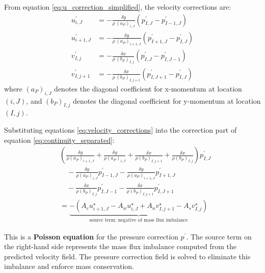 \documentclass[12pt]{article}
\theoremstyle{plain}  %
\theoremstyle{definition}  %
\begin{document}

\noindent From equation \eqref{eq:u_correction_simplified}, the velocity corrections are:
\begin{equation}\label{eq:velocity_corrections}
\begin{aligned}
u_{i,J}^{\prime} &= -\frac{\delta y}{\rho \, (a_{P})_{i,J}}(p_{I,J}^{\prime} - p_{I-1,J}^{\prime})\\[1ex]
u_{i+1,J}^{\prime} &= -\frac{\delta y}{\rho \, (a_{P})_{i+1,J}}(p_{I+1,J}^{\prime} - p_{I,J}^{\prime})\\[1ex]
v_{I,j}^{\prime} &= -\frac{\delta x}{\rho \, (b_{P})_{I,j}}(p_{I,J}^{\prime} - p_{I,J-1}^{\prime})\\[1ex]
v_{I,j+1}^{\prime} &= -\frac{\delta x}{\rho \, (b_{P})_{I,j+1}}(p_{I,J+1}^{\prime} - p_{I,J}^{\prime})
\end{aligned}
\end{equation}
where $(a_{P})_{i,J}$ denotes the diagonal coefficient for x-momentum at location $(i,J)$, and $(b_{P})_{I,j}$ denotes the diagonal coefficient for y-momentum at location $(I,j)$.


\noindent Substituting equations \eqref{eq:velocity_corrections} into the correction part of equation \eqref{eq:continuity_separated}:
\begin{equation}\label{eq:pressure_poisson}
\begin{aligned}
&\left(\frac{\delta y}{\rho(a_P)_{i+1,J}} + \frac{\delta y}{\rho(a_P)_{i,J}} + \frac{\delta x}{\rho(b_P)_{I,j+1}} + \frac{\delta x}{\rho(b_P)_{I,j}}\right) p_{I,J}^{\prime}\\[1ex]
&\quad - \frac{\delta y}{\rho(a_P)_{i,J}} p_{I-1,J}^{\prime} - \frac{\delta y}{\rho(a_P)_{i+1,J}} p_{I+1,J}^{\prime}\\[1ex]
&\quad - \frac{\delta x}{\rho(b_P)_{I,j}} p_{I,J-1}^{\prime} - \frac{\delta x}{\rho(b_P)_{I,j+1}} p_{I,J+1}^{\prime}\\[1ex]
&= \underbrace{-(A_{e}u_{i+1,J}^{\star} - A_{w}u_{i,J}^{\star} + A_{n}v_{I,j+1}^{\star} - A_{s}v_{I,j}^{\star})}_{\text{source term: negative of mass flux imbalance}}
\end{aligned}
\end{equation}

\noindent This is a \textbf{Poisson equation} for the pressure correction $p^{\prime}$. The source term on the right-hand side represents the mass flux imbalance computed from the predicted velocity field. The pressure correction field is solved to eliminate this imbalance and enforce mass conservation.
\end{document}

